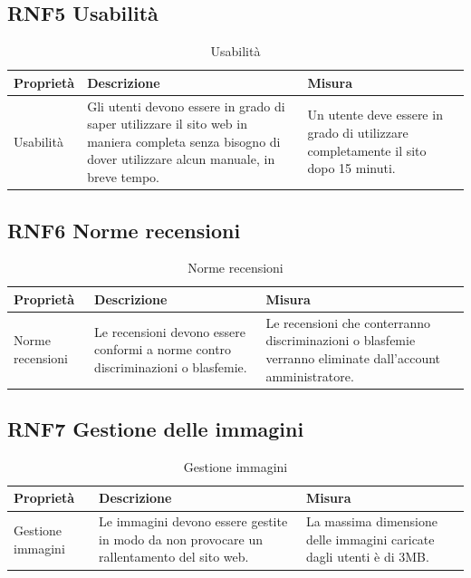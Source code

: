 \documentclass[a4paper,12pt]{article}
\begin{document}
\subsection*{RNF5 Usabilità}
\begin{table}[H]
    \centering
    \begin{tabular}{|p{}|p{}|p{}|}
        \hline  
         Proprietà & Descrizione & Misura\\
         \hline      
         Usabilità
         & Gli utenti devono essere in grado di saper utilizzare il sito web in maniera completa senza bisogno di dover utilizzare alcun manuale, in breve tempo.
         &Un utente deve essere in grado di utilizzare completamente il sito dopo 15 minuti.\\ \hline
    \end{tabular}
    \caption{Usabilità}
\end{table}


\subsection*{RNF6 Norme recensioni}
\begin{table}[H]
    \centering
    \begin{tabular}{|p{}|p{}|p{}|}
        \hline  
         Proprietà & Descrizione & Misura\\
         \hline      
         Norme recensioni
         & Le recensioni devono essere conformi a norme contro discriminazioni o blasfemie.
         &Le recensioni che conterranno discriminazioni o blasfemie verranno eliminate dall'account amministratore.\\ \hline
    \end{tabular}
    \caption{Norme recensioni}
\end{table}

\subsection*{RNF7 Gestione delle immagini}
\begin{table}[H]
    \centering
    \begin{tabular}{|p{}|p{}|p{}|}
        \hline  
         Proprietà & Descrizione & Misura\\
         \hline      
         Gestione immagini
         & Le immagini devono essere gestite in modo da non provocare un rallentamento del sito web.
         &La massima dimensione delle immagini caricate dagli utenti è di 3MB.\\ \hline
    \end{tabular}
    \caption{Gestione immagini}
\end{table}
\end{document}
